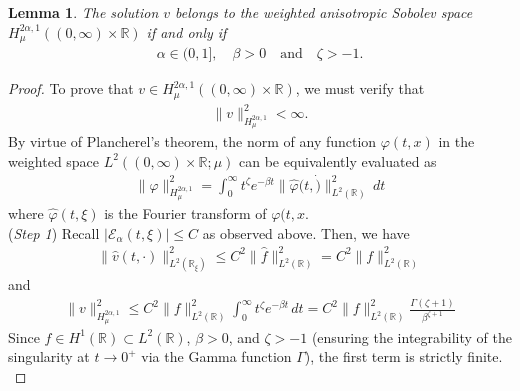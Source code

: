 \documentclass[10pt,a4paper]{article}
\numberwithin{equation}{section}
\theoremstyle{plain}
\newtheorem{lemma}{Lemma}
\theoremstyle{remark}
\begin{document}
\begin{lemma}
The solution $v$ belongs to the weighted anisotropic Sobolev space $H^{2\alpha, 1}_\mu((0, \infty) \times \mathbb{R})$ if and only if 
\begin{align*}
\alpha \in (0,1], \quad \beta > 0 \quad \text{and} \quad \zeta > - 1.
\end{align*}
\end{lemma}

\begin{proof}
To prove that $v \in H^{2\alpha, 1}_\mu((0, \infty) \times \mathbb{R})$, we must verify that
\begin{align*}
\|v\|^2_{H^{2\alpha, 1}_\mu} < \infty.
\end{align*}
By virtue of Plancherel's theorem, the norm of any function $\varphi(t,x)$ in the weighted space $L^2((0, \infty)\times \mathbb{R}; \mu)$ can be equivalently evaluated as
\begin{align*}
\|\varphi\|^2_{H^{2\alpha, 1}_\mu} = \int_0^\infty t^\zeta e^{-\beta t} \|\hat{\varphi}(t, \dot)\|^2_{L^2(\mathbb{R})} \, dt
\end{align*}
where $\hat{\varphi}(t, \xi)$ is the Fourier transform of $\varphi(t,x$.\\


({\it Step 1}) Recall $|\mathcal{E}_\alpha(t, \xi)| \le C$ as observed above. Then, we have
\begin{align*}
\|\hat{v}(t, \cdot)\|^2_{L^2(\mathbb{R}_\xi)} \le C^2 \|\hat{f}\|^2_{L^2(\mathbb{R})} = C^2 \|f\|^2_{L^2(\mathbb{R})}
\end{align*}
and
\begin{align*}
\|v\|^2_{H^{2\alpha, 1}_\mu} \le C^2 \|f\|^2_{L^2(\mathbb{R})} \int_0^\infty t^\zeta e^{-\beta t} \, dt = C^2 \|f\|^2_{L^2(\mathbb{R})} \frac{\Gamma(\zeta + 1)}{\beta^{\zeta + 1}}
\end{align*}
Since $f \in H^1(\mathbb{R}) \subset L^2(\mathbb{R})$, $\beta > 0$, and $\zeta > -1$ (ensuring the integrability of the singularity at $t \to 0^+$ via the Gamma function $\Gamma$), the first term is strictly finite.\\


\end{proof}
\end{document}
